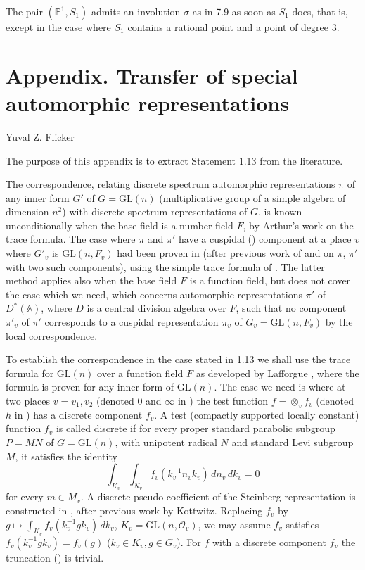 \documentclass[11pt,a4paper]{article}
\theoremstyle{plain}
\theoremstyle{definition}
\newcommand{\GL}{\mathrm{GL}}
\begin{document}
The pair $(\mathbb{P}^1, S_1)$ admits an involution $\sigma$ as in 7.9 as soon as $S_1$ does, that is, except in the case where $S_1$ contains a rational point and a point of degree $3$.

\section*{Appendix. Transfer of special automorphic representations}

\begin{center}
Yuval Z. Flicker
\end{center}

The purpose of this appendix is to extract Statement 1.13 from the literature.

The correspondence, relating discrete spectrum automorphic representations $\pi$ of any inner form $G'$ of $G = \GL(n)$ (multiplicative group of a simple algebra of dimension $n^2$) with discrete spectrum representations of $G$, is known unconditionally when the base field is a number field $F$, by Arthur's work on the trace formula. The case where $\pi$ and $\pi'$ have a cuspidal (\cite{BZ}) component at a place $v$ where $G'_v$ is $\GL(n, F_v)$ had been proven in \cite{FK} (after previous work of \cite{BDKV} and \cite{F1} on $\pi$, $\pi'$ with two such components), using the simple trace formula of \cite{FK}. The latter method applies also when the base field $F$ is a function field, but does not cover the case which we need, which concerns automorphic representations $\pi'$ of $D^*(\mathbb{A})$, where $D$ is a central division algebra over $F$, such that no component $\pi'_v$ of $\pi'$ corresponds to a cuspidal representation $\pi_v$ of $G_v = \GL(n, F_v)$ by the local correspondence.

To establish the correspondence in the case stated in 1.13 we shall use the trace formula for $\GL(n)$ over a function field $F$ as developed by Lafforgue \cite{Laf}, where the formula is proven for any inner form of $\GL(n)$. The case we need is where at two places $v = v_1, v_2$ (denoted $0$ and $\infty$ in \cite{Laf}) the test function $f = \otimes_v f_v$ (denoted $h$ in \cite{Laf}) has a discrete component $f_v$. A test (compactly supported locally constant) function $f_v$ is called discrete if for every proper standard parabolic subgroup $P = MN$ of $G = \GL(n)$, with unipotent radical $N$ and standard Levi subgroup $M$, it satisfies the identity
\[
\int_{K_v} \int_{N_v} f_v(k_v^{-1} n_v k_v) \, dn_v \, dk_v = 0
\]
for every $m \in M_v$. A discrete pseudo coefficient of the Steinberg representation is constructed in \cite[Theorem (5.1.3), p. 133]{Lau}, after previous work by Kottwitz. Replacing $f_v$ by $g \mapsto \int_{K_v} f_v(k_v^{-1} g k_v) \, dk_v$, $K_v = \GL(n, \mathcal{O}_v)$, we may assume $f_v$ satisfies $f_v(k_v^{-1} g k_v) = f_v(g)$ ($k_v \in K_v, g \in G_v$). For $f$ with a discrete component $f_v$ the truncation (\cite[pp. 225-227]{Laf}) is trivial.
\end{document}
